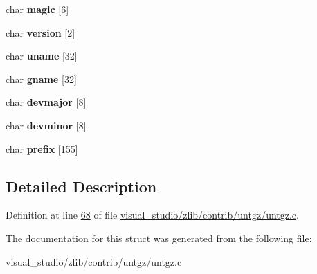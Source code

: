 \begin{DoxyCompactItemize}
char {\bfseries magic} \mbox{[}6\mbox{]}
\item 
\mbox{\label{structtar__header_afb3d22f902c2bb79eb10ffec4dc69ca9}} 
char {\bfseries version} \mbox{[}2\mbox{]}
\item 
\mbox{\label{structtar__header_a8ba75c5a508d4e126b9e2e9f6139010a}} 
char {\bfseries uname} \mbox{[}32\mbox{]}
\item 
\mbox{\label{structtar__header_a01535c91923ca14fadc97c6bcf15b431}} 
char {\bfseries gname} \mbox{[}32\mbox{]}
\item 
\mbox{\label{structtar__header_a9a4cbde1b2b2abb41018b207d508089a}} 
char {\bfseries devmajor} \mbox{[}8\mbox{]}
\item 
\mbox{\label{structtar__header_a838b90a91f237248e79f7c7540c5e180}} 
char {\bfseries devminor} \mbox{[}8\mbox{]}
\item 
\mbox{\label{structtar__header_ae8653ccadd2accf8f8713de880763809}} 
char {\bfseries prefix} \mbox{[}155\mbox{]}
\end{DoxyCompactItemize}


\subsection{Detailed Description}


Definition at line \hyperlink{visual__studio_2zlib_2contrib_2untgz_2untgz_8c_source_l00068}{68} of file \hyperlink{visual__studio_2zlib_2contrib_2untgz_2untgz_8c_source}{visual\+\_\+studio/zlib/contrib/untgz/untgz.\+c}.



The documentation for this struct was generated from the following file\+:\begin{DoxyCompactItemize}
\item 
visual\+\_\+studio/zlib/contrib/untgz/untgz.\+c\end{DoxyCompactItemize}
